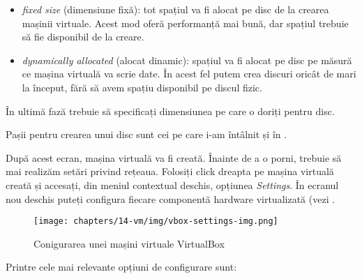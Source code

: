 \begin{itemize}
  \item \textit{fixed size} (dimensiune fixă): tot spațiul va fi alocat pe disc de
		la crearea mașinii virtuale. Acest mod oferă performanță mai
		bună, dar spațiul trebuie să fie disponibil de la creare.
  \item \textit{dynamically allocated} (alocat dinamic): spațiul va fi alocat pe
		disc pe măsură ce mașina virtuală va scrie date. În acest fel
		putem crea discuri oricât de mari la început, fără să avem
		spațiu disponibil pe discul fizic.
\end{itemize}

În ultimă fază trebuie să specificați dimensiunea pe care o doriți pentru disc.

Pașii pentru crearea unui disc sunt cei pe care i-am întâlnit și în .

După acest ecran, mașina virtuală va fi creată. Înainte de a o porni,
trebuie să mai realizăm setări privind rețeaua. Folosiți click dreapta
pe mașina virtuală creată și accesați, din meniul contextual deschis, opțiunea \textit{Settings}. În ecranul
nou deschis puteți configura fiecare componentă hardware virtualizată (vezi
.

\begin{figure}[!htbp]
	\centering
	\texttt{[image: chapters/14-vm/img/vbox-settings-img.png]}
	\caption{Conigurarea unei mașini virtuale VirtualBox}
	\label{fig:vm:vbox-settings}
\end{figure}

Printre cele mai relevante opțiuni de configurare sunt:

